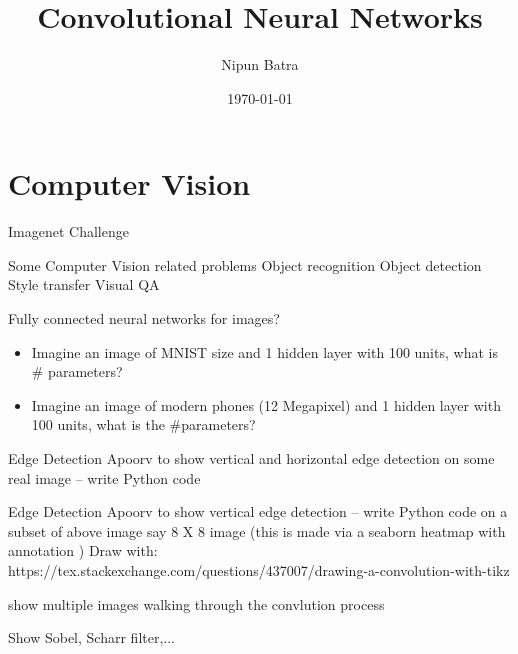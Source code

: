 \documentclass{beamer}
\title{Convolutional Neural Networks}
\date{\today}
\author{Nipun Batra}
\institute{IIT Gandhinagar}
\begin{document}
  \maketitle
  
  
  
\section{Computer Vision}

\begin{frame}{Imagenet Challenge}

\end{frame}

\begin{frame}{Some Computer Vision related problems}
Object recognition
Object detection
Style transfer
Visual QA
\end{frame}

\begin{frame}{Fully connected neural networks for images?}
\begin{itemize}
	\item Imagine an image of MNIST size and 1 hidden layer with 100 units, what is \# parameters?
	\item Imagine an image of modern phones (12 Megapixel) and 1 hidden layer with 100 units, what is the \#parameters?
\end{itemize}
\end{frame}

\begin{frame}{Edge Detection}
Apoorv to show vertical and horizontal edge detection on some real image -- write Python code

\end{frame}
\begin{frame}{Edge Detection}
Apoorv to show vertical edge detection -- write Python code on a subset of above image say 8 X 8 image (this is made via a seaborn heatmap with annotation ) 
Draw with: https://tex.stackexchange.com/questions/437007/drawing-a-convolution-with-tikz

show multiple images walking through the convlution process
\end{frame}

\begin{frame}
Show Sobel, Scharr filter,...
\end{frame}
\end{document}
